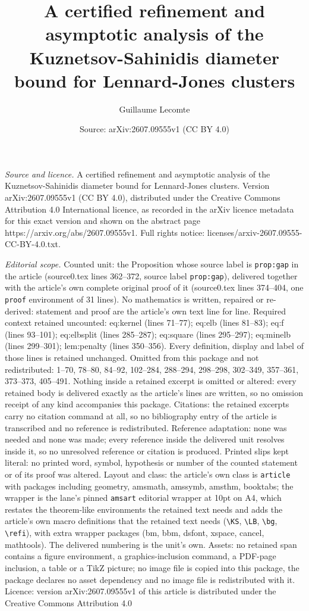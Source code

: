 \documentclass[10pt,a4paper]{amsart}
\title[A certified refinement and asymptotic analysis of the Kuznet]{A certified refinement and asymptotic analysis of the Kuznetsov-Sahinidis diameter bound for Lennard-Jones clusters}
\author{Guillaume Lecomte}
\date{Source: arXiv:2607.09555v1 (CC BY 4.0)}
\begin{document}
\maketitle

\noindent\emph{Source and licence.} A certified refinement and asymptotic analysis of the Kuznetsov-Sahinidis diameter bound for Lennard-Jones clusters. Version arXiv:2607.09555v1 (CC BY 4.0), distributed under the Creative Commons Attribution 4.0 International licence, as recorded in the arXiv licence metadata for this exact version and shown on the abstract page https://arxiv.org/abs/2607.09555v1. Full rights notice: licenses/arxiv-2607.09555-CC-BY-4.0.txt.\par\smallskip

\noindent\textit{Editorial scope.} Counted unit: the Proposition whose source label is \texttt{prop:gap} in the article (source0.tex lines 362--372, source label \texttt{prop:gap}), delivered together with the article's own complete original proof of it (source0.tex lines 374--404, one \texttt{proof} environment of 31 lines). No mathematics is written, repaired or re-derived: statement and proof are the article's own text line for line. Required context retained uncounted: eq:kernel (lines 71--77); eq:elb (lines 81--83); eq:f (lines 93--101); eq:elbsplit (lines 285--287); eq:square (lines 295--297); eq:minelb (lines 299--301); lem:penalty (lines 350--356). Every definition, display and label of those lines is retained unchanged. Omitted from this package and not redistributed: 1--70, 78--80, 84--92, 102--284, 288--294, 298--298, 302--349, 357--361, 373--373, 405--491. Nothing inside a retained excerpt is omitted or altered: every retained body is delivered exactly as the article's lines are written, so no omission receipt of any kind accompanies this package. Citations: the retained excerpts carry no citation command at all, so no bibliography entry of the article is transcribed and no reference is redistributed. Reference adaptation: none was needed and none was made; every reference inside the delivered unit resolves inside it, so no unresolved reference or citation is produced. Printed slips kept literal: no printed word, symbol, hypothesis or number of the counted statement or of its proof was altered. Layout and class: the article's own class is \texttt{article} with packages including geometry, amsmath, amssymb, amsthm, booktabs; the wrapper is the lane's pinned \texttt{amsart} editorial wrapper at 10pt on A4, which restates the theorem-like environments the retained text needs and adds the article's own macro definitions that the retained text needs (\texttt{\textbackslash KS}, \texttt{\textbackslash LB}, \texttt{\textbackslash bg}, \texttt{\textbackslash refi}), with extra wrapper packages (bm, bbm, dsfont, xspace, cancel, mathtools). The delivered numbering is the unit's own. Assets: no retained span contains a figure environment, a graphics-inclusion command, a PDF-page inclusion, a table or a TikZ picture; no image file is copied into this package, the package declares no asset dependency and no image file is redistributed with it. Licence: version arXiv:2607.09555v1 of this article is distributed under the Creative Commons Attribution 4.0 
\end{document}
